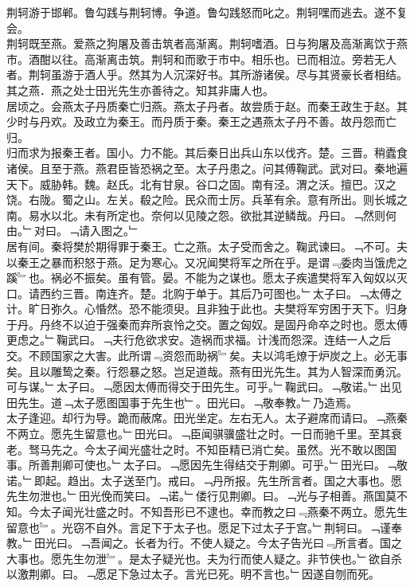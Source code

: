 \documentclass{zhvt-classic}
\begin{document}
\hspace*{2em}荆轲游于邯郸。鲁勾践与荆轲博。争道。鲁勾践怒而叱之。荆轲嘿而逃去。遂不复会。\\
\hspace*{2em}荆轲既至燕。爱燕之狗屠及善击筑者高渐离。荆轲嗜酒。日与狗屠及高渐离饮于燕市。酒酣以往。高渐离击筑。荆轲和而歌于市中。相乐也。已而相泣。旁若无人者。荆轲虽游于酒人乎。然其为人沉深好书。其所游诸侯。尽与其贤豪长者相结。其之燕．燕之处士田光先生亦善待之。知其非庸人也。\\
\hspace*{2em}居顷之。会燕太子丹质秦亡归燕。燕太子丹者。故尝质于赵。而秦王政生于赵。其少时与丹欢。及政立为秦王。而丹质于秦。秦王之遇燕太子丹不善。故丹怨而亡归。\\
\hspace*{2em}归而求为报秦王者。国小。力不能。其后秦日出兵山东以伐齐。楚。三晋。稍蠹食诸侯。且至于燕。燕君臣皆恐祸之至。太子丹患之。问其傅鞠武。武对曰。秦地遍天下。威胁韩。魏。赵氏。北有甘泉。谷口之固。南有泾。渭之沃。擅巴。汉之饶。右陇。蜀之山。左关。殽之险。民众而士厉。兵革有余。意有所出。则长城之南。易水以北。未有所定也。奈何以见陵之怨。欲批其逆鳞哉。丹曰。﹁然则何由。﹂对曰。﹁请入图之。﹂\\
\hspace*{2em}居有间。秦将樊於期得罪于秦王。亡之燕。太子受而舍之。鞠武谏曰。﹁不可。夫以秦王之暴而积怒于燕。足为寒心。又况闻樊将军之所在乎。是谓﹃委肉当饿虎之蹊﹄也。祸必不振矣。虽有管。晏。不能为之谋也。愿太子疾遣樊将军入匈奴以灭口。请西约三晋。南连齐。楚。北购于单于。其后乃可图也。﹂太子曰。﹁太傅之计。旷日弥久。心惛然。恐不能须臾。且非独于此也。夫樊将军穷困于天下。归身于丹。丹终不以迫于强秦而弃所哀怜之交。置之匈奴。是固丹命卒之时也。愿太傅更虑之。﹂鞠武曰。﹁夫行危欲求安。造祸而求福。计浅而怨深。连结一人之后交。不顾国家之大害。此所谓﹃资怨而助祸﹄矣。夫以鸿毛燎于炉炭之上。必无事矣。且以雕鸷之秦。行怨暴之怒。岂足道哉。燕有田光先生。其为人智深而勇沉。可与谋。﹂太子曰。﹁愿因太傅而得交于田先生。可乎。﹂鞠武曰。﹁敬诺。﹂出见田先生。道﹁太子愿图国事于先生也﹂。田光曰。﹁敬奉教。﹂乃造焉。\\
\hspace*{2em}太子逢迎。却行为导。跪而蔽席。田光坐定。左右无人。太子避席而请曰。﹁燕秦不两立。愿先生留意也。﹂田光曰。﹁臣闻骐骥盛壮之时。一日而驰千里。至其衰老。驽马先之。今太子闻光盛壮之时。不知臣精已消亡矣。虽然。光不敢以图国事。所善荆卿可使也。﹂太子曰。﹁愿因先生得结交于荆卿。可乎。﹂田光曰。﹁敬诺。﹂即起。趋出。太子送至门。戒曰。﹁丹所报。先生所言者。国之大事也。愿先生勿泄也。﹂田光俛而笑曰。﹁诺。﹂偻行见荆卿。曰。﹁光与子相善。燕国莫不知。今太子闻光壮盛之时。不知吾形已不逮也。幸而教之曰﹃燕秦不两立。愿先生留意也﹄。光窃不自外。言足下于太子也。愿足下过太子于宫。﹂荆轲曰。﹁谨奉教。﹂田光曰。﹁吾闻之。长者为行。不使人疑之。今太子告光曰﹃所言者。国之大事也。愿先生勿泄﹄。是太子疑光也。夫为行而使人疑之。非节侠也。﹂欲自杀以激荆卿。曰。﹁愿足下急过太子。言光已死。明不言也。﹂因遂自刎而死。\\
\end{document}
